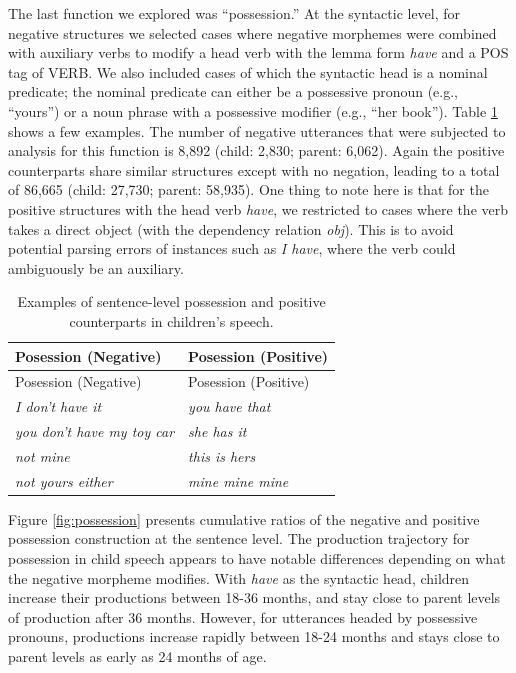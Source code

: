 \documentclass[
  english,
  man,floatsintext]{apa6}
\begin{document}
The last function we explored was ``possession.'' At the syntactic level, for negative structures we selected cases where negative morphemes were combined with auxiliary verbs to modify a head verb with the lemma form \emph{have} and a POS tag of VERB. We also included cases of which the syntactic head is a nominal predicate; the nominal predicate can either be a possessive pronoun (e.g., ``yours'') or a noun phrase with a possessive modifier (e.g., ``her book''). Table \ref{tab:possess} shows a few examples. The number of negative utterances that were subjected to analysis for this function is 8,892 (child: 2,830; parent: 6,062). Again the positive counterparts share similar structures except with no negation, leading to a total of 86,665 (child: 27,730; parent: 58,935). One thing to note here is that for the positive structures with the head verb \emph{have}, we restricted to cases where the verb takes a direct object (with the dependency relation \emph{obj}). This is to avoid potential parsing errors of instances such as \emph{I have}, where the verb could ambiguously be an auxiliary.

\begin{longtable}[]{@{}ll@{}}
\caption{\label{tab:possess} Examples of sentence-level possession and positive counterparts in children's speech.}\tabularnewline
\toprule
Posession (Negative) & Posession (Positive) \\
\midrule
\endfirsthead
\toprule
Posession (Negative) & Posession (Positive) \\
\midrule
\endhead
\emph{I don't have it} & \emph{you have that} \\
\emph{you don't have my toy car} & \emph{she has it} \\
\emph{not mine} & \emph{this is hers} \\
\emph{not yours either} & \emph{mine mine mine} \\
\bottomrule
\end{longtable}

Figure \ref{fig:possession} presents cumulative ratios of the negative and positive possession construction at the sentence level. The production trajectory for possession in child speech appears to have notable differences depending on what the negative morpheme modifies. With \emph{have} as the syntactic head, children increase their productions between 18-36 months, and stay close to parent levels of production after 36 months. However, for utterances headed by possessive pronouns, productions increase rapidly between 18-24 months and stays close to parent levels as early as 24 months of age.
\end{document}
